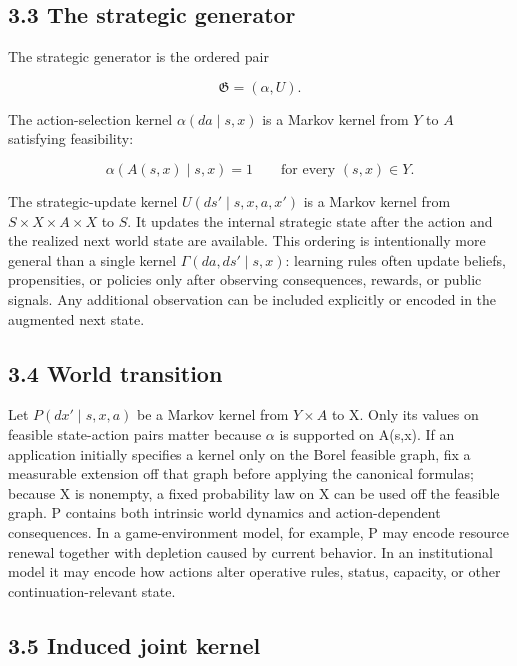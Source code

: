 \documentclass[10pt]{article}
\begin{document}
\subsection{3.3 The strategic generator}\label{the-strategic-generator}

The strategic generator is the ordered pair

\begin{equation}
\mathfrak G=(\alpha,U).
\tag{3}\label{eq:3}
\end{equation}

The action-selection kernel \(\alpha(da\mid s,x)\) is a Markov kernel
from \(Y\) to \(A\) satisfying feasibility:

\begin{equation}
\alpha\!\left(A(s,x)\mid s,x\right)=1\qquad\text{for every }(s,x)\in Y.
\tag{4}\label{eq:4}
\end{equation}

The strategic-update kernel \(U(ds'\mid s,x,a,x')\) is a Markov kernel
from \(S\times{}X\times{}A\times{}X\) to \(S\). It updates the internal
strategic state after the action and the realized next world state are
available. This ordering is intentionally more general than a single
kernel \(\Gamma(da,ds'\mid s,x)\): learning rules often update beliefs,
propensities, or policies only after observing consequences, rewards, or
public signals. Any additional observation can be included explicitly or
encoded in the augmented next state.

\subsection{3.4 World transition}\label{world-transition}

Let \(P(dx'\mid s,x,a)\) be a Markov kernel from \(Y\times{}A\) to X.
Only its values on feasible state-action pairs matter because \(\alpha\)
is supported on A(s,x). If an application initially specifies a kernel
only on the Borel feasible graph, fix a measurable extension off that
graph before applying the canonical formulas; because X is nonempty, a
fixed probability law on X can be used off the feasible graph. P
contains both intrinsic world dynamics and action-dependent
consequences. In a game-environment model, for example, P may encode
resource renewal together with depletion caused by current behavior. In
an institutional model it may encode how actions alter operative rules,
status, capacity, or other continuation-relevant state.

\subsection{3.5 Induced joint kernel}\label{induced-joint-kernel}
\end{document}
